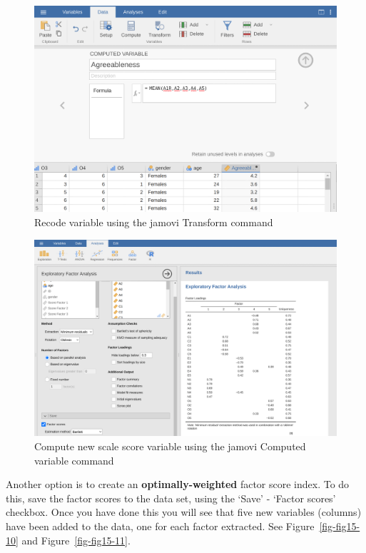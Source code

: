 \documentclass[
  a4paper,
]{book}
\begin{document}
\begin{figure}

\includegraphics[width=1\textwidth,height=\textheight]{images/fig15-8.png} \hfill{}

\caption{\label{fig-fig15-8}Recode variable using the jamovi Transform
command}

\end{figure}

\begin{figure}

\includegraphics[width=1\textwidth,height=\textheight]{images/fig15-9.png} \hfill{}

\caption{\label{fig-fig15-9}Compute new scale score variable using the
jamovi Computed variable command}

\end{figure}

Another option is to create an \textbf{optimally-weighted} factor score
index. To do this, save the factor scores to the data set, using the
`Save' - `Factor scores' checkbox. Once you have done this you will see
that five new variables (columns) have been added to the data, one for
each factor extracted. See Figure~\ref{fig-fig15-10} and
Figure~\ref{fig-fig15-11}.
\end{document}
